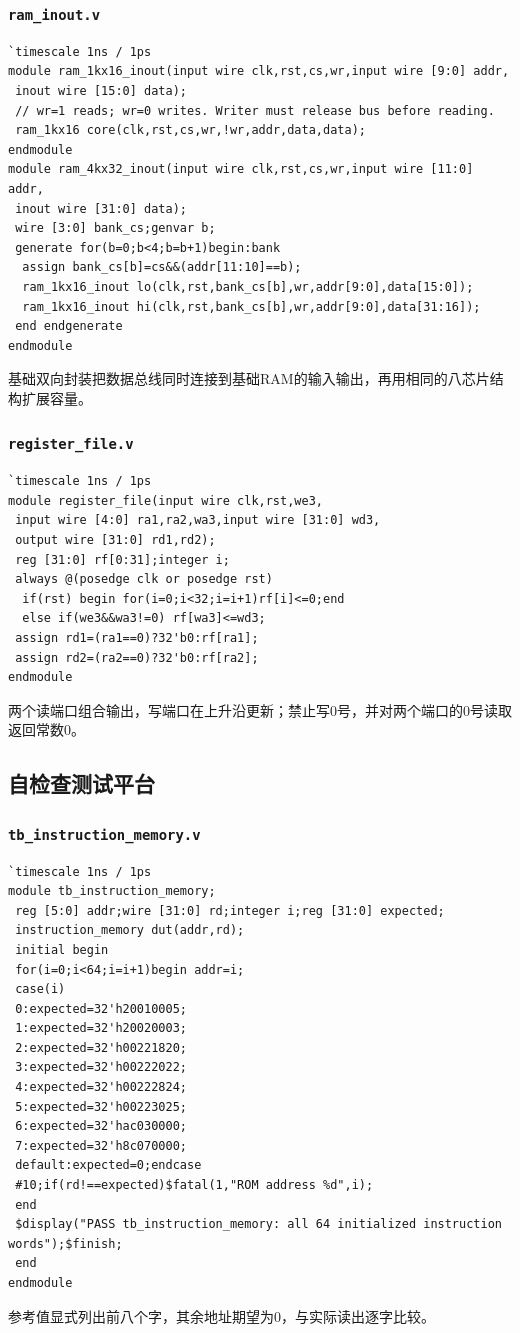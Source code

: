 \documentclass[12pt,a4paper]{ctexart}
\begin{document}
\subsubsection*{\texttt{ram\_inout.v}}
\begin{lstlisting}
`timescale 1ns / 1ps
module ram_1kx16_inout(input wire clk,rst,cs,wr,input wire [9:0] addr,
 inout wire [15:0] data);
 // wr=1 reads; wr=0 writes. Writer must release bus before reading.
 ram_1kx16 core(clk,rst,cs,wr,!wr,addr,data,data);
endmodule
module ram_4kx32_inout(input wire clk,rst,cs,wr,input wire [11:0] addr,
 inout wire [31:0] data);
 wire [3:0] bank_cs;genvar b;
 generate for(b=0;b<4;b=b+1)begin:bank
  assign bank_cs[b]=cs&&(addr[11:10]==b);
  ram_1kx16_inout lo(clk,rst,bank_cs[b],wr,addr[9:0],data[15:0]);
  ram_1kx16_inout hi(clk,rst,bank_cs[b],wr,addr[9:0],data[31:16]);
 end endgenerate
endmodule
\end{lstlisting}
基础双向封装把数据总线同时连接到基础RAM的输入输出，再用相同的八芯片结构扩展容量。

\subsubsection*{\texttt{register\_file.v}}
\begin{lstlisting}
`timescale 1ns / 1ps
module register_file(input wire clk,rst,we3,
 input wire [4:0] ra1,ra2,wa3,input wire [31:0] wd3,
 output wire [31:0] rd1,rd2);
 reg [31:0] rf[0:31];integer i;
 always @(posedge clk or posedge rst)
  if(rst) begin for(i=0;i<32;i=i+1)rf[i]<=0;end
  else if(we3&&wa3!=0) rf[wa3]<=wd3;
 assign rd1=(ra1==0)?32'b0:rf[ra1];
 assign rd2=(ra2==0)?32'b0:rf[ra2];
endmodule
\end{lstlisting}
两个读端口组合输出，写端口在上升沿更新；禁止写0号，并对两个端口的0号读取返回常数0。

\subsection*{自检查测试平台}
\subsubsection*{\texttt{tb\_instruction\_memory.v}}
\begin{lstlisting}
`timescale 1ns / 1ps
module tb_instruction_memory;
 reg [5:0] addr;wire [31:0] rd;integer i;reg [31:0] expected;
 instruction_memory dut(addr,rd);
 initial begin
 for(i=0;i<64;i=i+1)begin addr=i;
 case(i)
 0:expected=32'h20010005;
 1:expected=32'h20020003;
 2:expected=32'h00221820;
 3:expected=32'h00222022;
 4:expected=32'h00222824;
 5:expected=32'h00223025;
 6:expected=32'hac030000;
 7:expected=32'h8c070000;
 default:expected=0;endcase
 #10;if(rd!==expected)$fatal(1,"ROM address %d",i);
 end
 $display("PASS tb_instruction_memory: all 64 initialized instruction words");$finish;
 end
endmodule
\end{lstlisting}
参考值显式列出前八个字，其余地址期望为0，与实际读出逐字比较。
\end{document}

